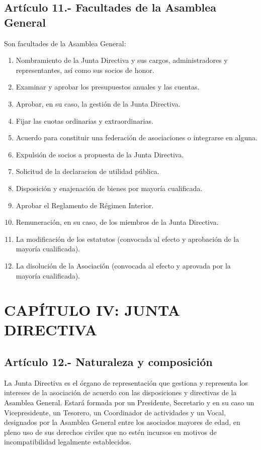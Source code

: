 \documentclass[12pt]{article}
\begin{document}
\subsection{Artículo 11.- Facultades de la Asamblea General}
Son facultades de la Asamblea General:
\begin{enumerate}[label=\alph*)]
    \item Nombramiento de la Junta Directiva y sus cargos, administradores y representantes, así como sus socios de honor.
    \item Examinar y aprobar los presupuestos anuales y las cuentas.
    \item Aprobar, en su caso, la gestión de la Junta Directiva.
    \item Fijar las cuotas ordinarias y extraordinarias.
    \item Acuerdo para constituir una federación de asociaciones o integrarse en alguna.
    \item Expulsión de socios a propuesta de la Junta Directiva.
    \item Solicitud de la declaracion de utilidad pública.
    \item Disposición y enajenación de bienes por mayoría cualificada.
    \item Aprobar el Reglamento de Régimen Interior.
    \item Remuneración, en su caso, de los miembros de la Junta Directiva.
    \item La modificación de los estatutos (convocada al efecto y aprobación de la mayoría cualificada).
    \item La disolución de la Asociación (convocada al efecto y aprovada por la mayoría cualificada).
\end{enumerate}


\section{CAPÍTULO IV: JUNTA DIRECTIVA}


\subsection{Artículo 12.- Naturaleza y composición}
La Junta Directiva es el órgano de representación que gestiona y representa los intereses de la asociación de acuerdo con las disposiciones y directivas de la Asamblea General. Estará formada por un Presidente, Secretario y en su caso un Vicepresidente, un Tesorero, un Coordinador de actividades y un Vocal, designados por la Asamblea General entre los asociados mayores de edad, en pleno uso de sus derechos civiles que no estén incursos en motivos de incompatibilidad legalmente establecidos.
\end{document}
